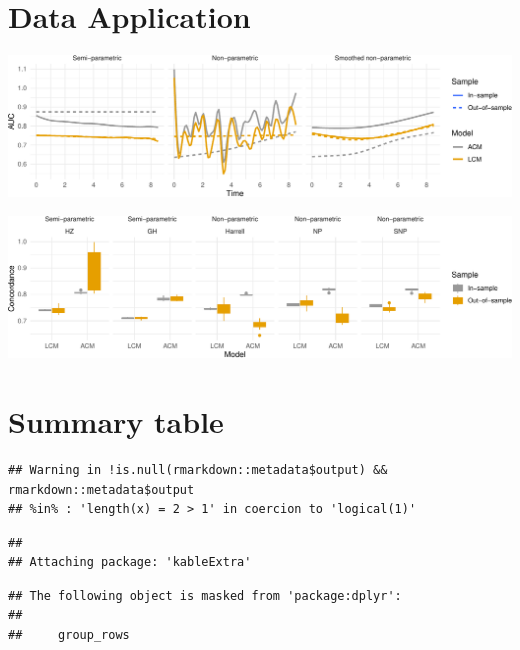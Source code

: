 \documentclass[
]{article}
\begin{document}
\hypertarget{data-application}{%
\section{Data Application}\label{data-application}}

\includegraphics{ProgressReport_files/figure-latex/appl_auc-1.pdf}

\includegraphics{ProgressReport_files/figure-latex/appl_c-1.pdf}

\hypertarget{summary-table}{%
\section{Summary table}\label{summary-table}}

\begin{verbatim}
## Warning in !is.null(rmarkdown::metadata$output) && rmarkdown::metadata$output
## %in% : 'length(x) = 2 > 1' in coercion to 'logical(1)'
\end{verbatim}

\begin{verbatim}
## 
## Attaching package: 'kableExtra'
\end{verbatim}

\begin{verbatim}
## The following object is masked from 'package:dplyr':
## 
##     group_rows
\end{verbatim}
\end{document}
